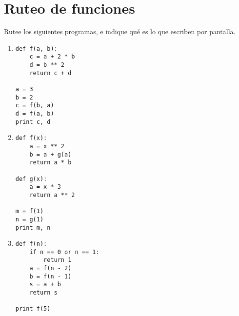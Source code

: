 \section{Ruteo de funciones}

Rutee los siguientes programas, e indique qué es lo que escriben por
pantalla.

\begin{enumerate}

  \item
\begin{lstlisting}
def f(a, b):
    c = a + 2 * b
    d = b ** 2
    return c + d

a = 3
b = 2
c = f(b, a)
d = f(a, b)
print c, d
\end{lstlisting}

  \item
\begin{lstlisting}
def f(x):
    a = x ** 2
    b = a + g(a)
    return a * b

def g(x):
    a = x * 3
    return a ** 2

m = f(1)
n = g(1)
print m, n
\end{lstlisting}

  \item
\begin{lstlisting}
def f(n):
    if n == 0 or n == 1:
        return 1
    a = f(n - 2)
    b = f(n - 1)
    s = a + b
    return s

print f(5)
\end{lstlisting}

\end{enumerate}

